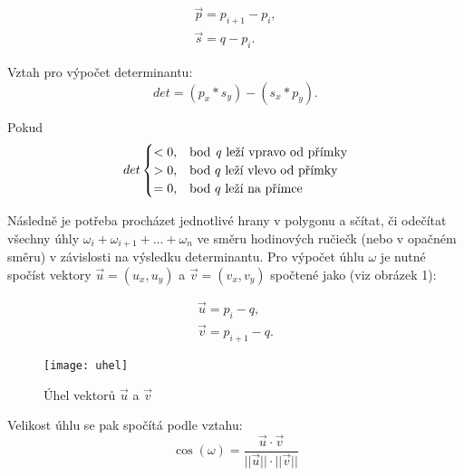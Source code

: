 \begin{equation}\begin{aligned}\vec{p} = p_{i+1} - p_i, \\
 \vec{s} = q - p_i.\end{aligned}\end{equation}

\par Vztah pro výpočet determinantu:
\begin{equation}det = (p_x*s_y)-(s_x*p_y).\end{equation}

\par Pokud
\begin{equation} det\begin{cases} < 0, & \text{bod\emph{ q}\ leží vpravo od přímky} \\ > 0,& \text{bod }q\text{ leží vlevo od přímky} \\ = 0 , & \text{bod }q\text{ leží na přímce} \end{cases}\end{equation}

\par Následně je potřeba procházet jednotlivé hrany v polygonu a sčítat, či odečítat všechny úhly $\omega_i + \omega_{i+1} + ... + \omega_n$ ve směru hodinových ručiečk (nebo v opačném směru) v závislosti na výsledku determinantu. Pro výpočet úhlu $\omega$ je nutné spočíst vektory $\vec{u} = (u_x,u_y)$ a $\vec{v} = (v_x,v_y)$ spočtené jako (viz obrázek 1): 

\begin{equation}\begin{aligned}\vec{u} = p_i - q, \\
                                \vec{v} = p_{i+1} - q .
 \end{aligned}\end{equation}

\begin{figure}[h]
    \centering
        \texttt{[image: uhel]} %
    \caption{Úhel vektorů $\vec{u}$ a $\vec{v}$}
\end{figure}

\newpage

\par Velikost úhlu se pak spočítá podle vztahu:
\begin{equation}\cos(\omega) = \frac{\vec{u}\cdot\vec{v}}{||\vec{u}||\cdot||\vec{v}||}\end{equation}

